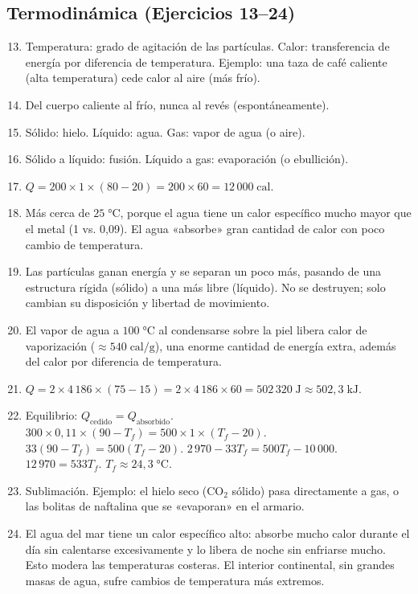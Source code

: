 \documentclass[12pt, a4paper]{article}
\begin{document}
\subsection*{Termodinámica (Ejercicios 13--24)}

\begin{enumerate}[leftmargin=*, label=\textbf{\arabic*.}]
  \setcounter{enumi}{12}
  \item Temperatura: grado de agitación de las partículas. Calor: transferencia de energía por diferencia de temperatura. Ejemplo: una taza de café caliente (alta temperatura) cede calor al aire (más frío).

  \item Del cuerpo caliente al frío, nunca al revés (espontáneamente).

  \item Sólido: hielo. Líquido: agua. Gas: vapor de agua (o aire).

  \item Sólido a líquido: fusión. Líquido a gas: evaporación (o ebullición).

  \item $Q = 200 \times 1 \times (80 - 20) = 200 \times 60 = 12\,000\;\text{cal}$.

  \item Más cerca de $25\;°\text{C}$, porque el agua tiene un calor específico mucho mayor que el metal (1 vs. 0,09). El agua «absorbe» gran cantidad de calor con poco cambio de temperatura.

  \item Las partículas ganan energía y se separan un poco más, pasando de una estructura rígida (sólido) a una más libre (líquido). No se destruyen; solo cambian su disposición y libertad de movimiento.

  \item El vapor de agua a $100\;°\text{C}$ al condensarse sobre la piel libera calor de vaporización ($\approx 540\;\text{cal/g}$), una enorme cantidad de energía extra, además del calor por diferencia de temperatura.

  \item $Q = 2 \times 4\,186 \times (75 - 15) = 2 \times 4\,186 \times 60 = 502\,320\;\text{J} \approx 502{,}3\;\text{kJ}$.

  \item Equilibrio: $Q_{\text{cedido}} = Q_{\text{absorbido}}$. $300 \times 0{,}11 \times (90 - T_f) = 500 \times 1 \times (T_f - 20)$. $33(90 - T_f) = 500(T_f - 20)$. $2\,970 - 33T_f = 500T_f - 10\,000$. $12\,970 = 533T_f$. $T_f \approx 24{,}3\;°\text{C}$.

  \item Sublimación. Ejemplo: el hielo seco (CO$_2$ sólido) pasa directamente a gas, o las bolitas de naftalina que se «evaporan» en el armario.

  \item El agua del mar tiene un calor específico alto: absorbe mucho calor durante el día sin calentarse excesivamente y lo libera de noche sin enfriarse mucho. Esto modera las temperaturas costeras. El interior continental, sin grandes masas de agua, sufre cambios de temperatura más extremos.
\end{enumerate}
\end{document}
